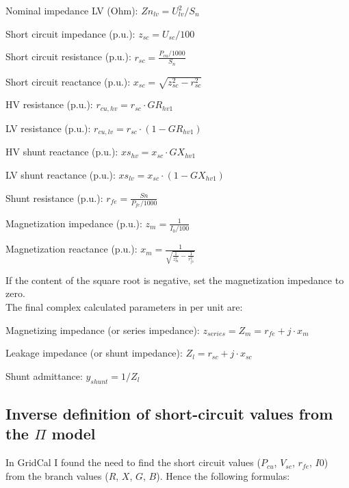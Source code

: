 \documentclass[11pt,fleqn]{book} %
\begin{document}
Nominal impedance LV (Ohm): $Zn_{lv} = U_{lv}^2 / S_n$ \newline


Short circuit impedance (p.u.): $z_{sc} = U_{sc} / 100$\newline

Short circuit resistance (p.u.): $r_{sc} = \frac{P_{cu} / 1000}{S_n}$\newline

Short circuit reactance (p.u.): $x_{sc} = \sqrt{z_{sc}^2 - r_{sc} ^2}$\newline


HV resistance (p.u.): $r_{cu,hv} = r_{sc} \cdot GR_{hv1}$\newline


LV resistance (p.u.): $r_{cu,lv} = r_{sc} \cdot (1 - GR_{hv1})$\newline


HV shunt reactance (p.u.): $xs_{hv} = x_{sc} \cdot GX_{hv1}$\newline


LV shunt reactance (p.u.): $xs_{lv} = x_{sc} \cdot (1 - GX_{hv1})$\newline

Shunt resistance (p.u.): $r_{fe} = \frac{Sn}{P_{fe} / 1000}$\newline


Magnetization impedance (p.u.): $z_m = \frac{1}{I_0 / 100}$\newline

Magnetization reactance (p.u.): $x_m = \frac{1}{\sqrt{\frac{1}{z_m^2} - \frac{1}{r_{fe}^2}}}$ \newline

If the content of the square root is negative, set the magnetization impedance to zero.\\


The final complex calculated parameters in per unit are:

Magnetizing impedance (or series impedance): $z_{series} = Z_m = r_{fe} +j \cdot x_m$

Leakage impedance (or shunt impedance): $Z_l = r_{sc} + j \cdot x_{sc}$

Shunt admittance: $y_{shunt} = 1 / Z_l$


\subsection{Inverse definition of short-circuit values from the $\Pi$ model}

In GridCal I found the need to find the short circuit values ($P_{cu}$, $V_{sc}$, $r_{fe}$, $I0$) from the branch values ($R$, $X$, $G$, $B$). Hence the following formulas:
\end{document}
